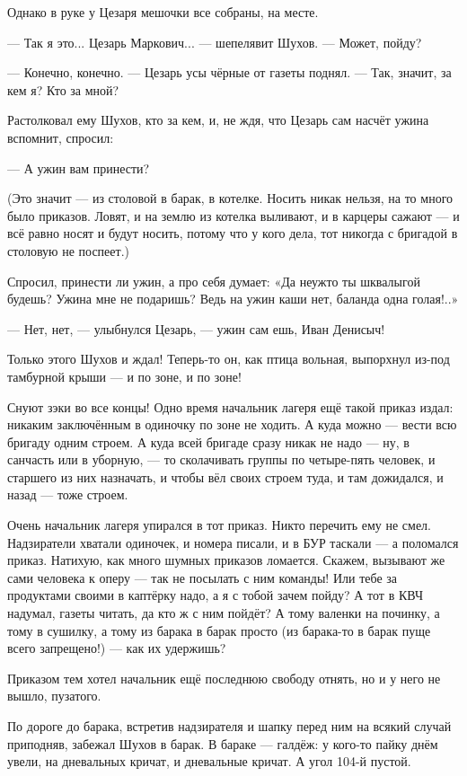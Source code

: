 Однако в руке у Цезаря мешочки все собраны, на месте.

--- Так я это... Цезарь Маркович... --- шепелявит Шухов. --- Может, пойду?

--- Конечно, конечно. --- Цезарь усы чёрные от газеты поднял. --- Так, значит, за кем я? Кто за мной?

Растолковал ему Шухов, кто за кем, и, не ждя, что Цезарь сам насчёт ужина вспомнит, спросил:

--- А ужин вам принести?

(Это значит --- из столовой в барак, в котелке. Носить никак нельзя, на то много было приказов.
Ловят, и на землю из котелка выливают, и в карцеры сажают --- и всё равно носят и будут носить,
потому что у кого дела, тот никогда с бригадой в столовую не поспеет.)

Спросил, принести ли ужин, а про себя думает: «Да неужто ты шквалыгой будешь? Ужина мне не
подаришь? Ведь на ужин каши нет, баланда одна голая!..»

--- Нет, нет, --- улыбнулся Цезарь, --- ужин сам ешь, Иван Денисыч!

Только этого Шухов и ждал! Теперь-то он, как птица вольная, выпорхнул из-под тамбурной крыши
--- и по зоне, и по зоне!

Снуют зэки во все концы! Одно время начальник лагеря ещё такой приказ издал: никаким
заключённым в одиночку по зоне не ходить. А куда можно --- вести всю бригаду одним строем. А
куда всей бригаде сразу никак не надо --- ну, в санчасть или в уборную, --- то сколачивать группы
по четыре-пять человек, и старшего из них назначать, и чтобы вёл своих строем туда, и там
дожидался, и назад --- тоже строем.

Очень начальник лагеря упирался в тот приказ. Никто перечить ему не смел. Надзиратели
хватали одиночек, и номера писали, и в БУР таскали --- а поломался приказ. Натихую, как много
шумных приказов ломается. Скажем, вызывают же сами человека к оперу --- так не посылать с ним
команды! Или тебе за продуктами своими в каптёрку надо, а я с тобой зачем пойду? А тот в КВЧ
надумал, газеты читать, да кто ж с ним пойдёт? А тому валенки на починку, а тому в сушилку, а
тому из барака в барак просто (из барака-то в барак пуще всего запрещено!) --- как их удержишь?

Приказом тем хотел начальник ещё последнюю свободу отнять, но и у него не вышло, пузатого.

По дороге до барака, встретив надзирателя и шапку перед ним на всякий случай приподняв,
забежал Шухов в барак. В бараке --- галдёж: у кого-то пайку днём увели, на дневальных кричат, и
дневальные кричат. А угол 104-й пустой.


